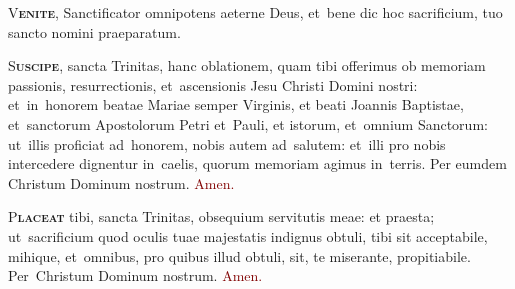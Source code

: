 \documentclass[12pt, landscape]{scrartcl}
\newcommand{\cross}{\textcolor{red}{\raisebox{-1mm}{\scalebox{1.5}{\ding{64}}}}}
\newcommand{\amen}{\textcolor{Maroon}{Amen.}}
\newcommand{\initial}[2]{\lettrine[lines=3]{\color{Maroon}#1}{\bfseries\color{Maroon}#2}}
\newcommand{\gap}{\vspace{0.3cm}}
\begin{document}
\begin{center}
\begin{minipage}[t]{0.29\linewidth}
		\gap

		\initial{V}{enite}, Sanctificator omnipotens aeterne Deus, et~bene\cross
		dic hoc sacrificium, tuo sancto nomini praeparatum.

		\gap

		\initial{S}{uscipe}, sancta Trinitas, hanc oblationem, quam tibi
		offerimus ob memoriam passionis, resurrectionis, et~ascensionis Jesu
		Christi Domini nostri: et~in~honorem beatae Mariae semper Virginis, et
		beati Joannis Baptistae, et~sanctorum Apostolorum Petri et~Pauli, et
		istorum, et~omnium Sanctorum: ut~illis proficiat ad~honorem, nobis autem
		ad~salutem: et~illi pro nobis intercedere dignentur in~caelis, quorum
		memoriam agimus in~terris. Per eumdem Christum Dominum nostrum. \amen

		\gap

		\initial{P}{laceat} tibi, sancta Trinitas, obsequium servitutis meae: et
		praesta; ut~sacrificium quod oculis tuae majestatis indignus obtuli,
		tibi sit acceptabile, mihique, et~omnibus, pro quibus illud obtuli, sit,
		te miserante, propitiabile. Per~Christum Dominum nostrum. \amen

	\end{minipage}
\end{center}

\end{document}
